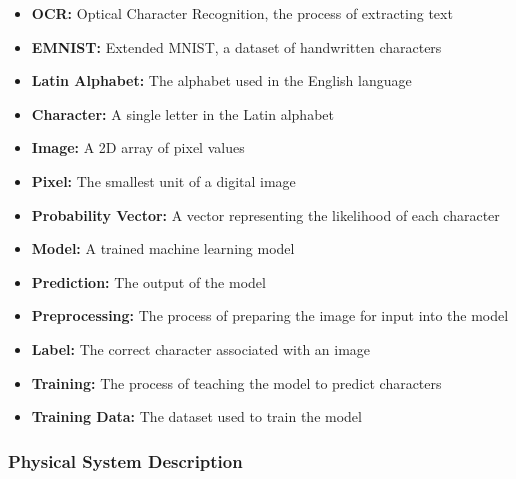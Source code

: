 \documentclass[12pt]{article}
\begin{document}
\begin{itemize}

\item \textbf{OCR:} Optical Character Recognition, the process of extracting text
\item \textbf{EMNIST:} Extended MNIST, a dataset of handwritten characters
\item \textbf{Latin Alphabet:} The alphabet used in the English language
\item \textbf{Character:} A single letter in the Latin alphabet
\item \textbf{Image:} A 2D array of pixel values
\item \textbf{Pixel:} The smallest unit of a digital image
\item \textbf{Probability Vector:} A vector representing the likelihood of each character
\item \textbf{Model:} A trained machine learning model
\item \textbf{Prediction:} The output of the model
\item \textbf{Preprocessing:} The process of preparing the image for input into the model
\item \textbf{Label:} The correct character associated with an image
\item \textbf{Training:} The process of teaching the model to predict characters
\item \textbf{Training Data:} The dataset used to train the model

\end{itemize}

\subsubsection{Physical System Description} \label{sec_phySystDescrip}

\end{document}
